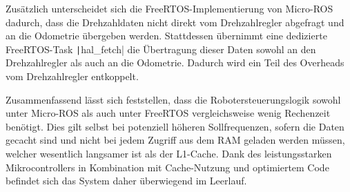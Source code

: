 Zusätzlich unterscheidet sich die FreeRTOS-Implementierung von Micro-ROS
dadurch, dass die Drehzahldaten nicht direkt vom Drehzahlregler abgefragt und an
die Odometrie übergeben werden. Stattdessen übernimmt eine dedizierte
FreeRTOS-Task \texttt|hal_fetch| die Übertragung dieser Daten sowohl an
den Drehzahlregler als auch an die Odometrie. Dadurch wird ein Teil des
Overheads vom Drehzahlregler entkoppelt.

Zusammenfassend lässt sich feststellen, dass die Robotersteuerungslogik sowohl
unter Micro-ROS als auch unter FreeRTOS vergleichsweise wenig Rechenzeit
benötigt. Dies gilt selbst bei potenziell höheren Sollfrequenzen, sofern die
Daten gecacht sind und nicht bei jedem Zugriff aus dem RAM geladen werden
müssen, welcher wesentlich langsamer ist als der L1-Cache. Dank des
leistungsstarken Mikrocontrollers in Kombination mit Cache-Nutzung und
optimiertem Code befindet sich das System daher überwiegend im Leerlauf.
